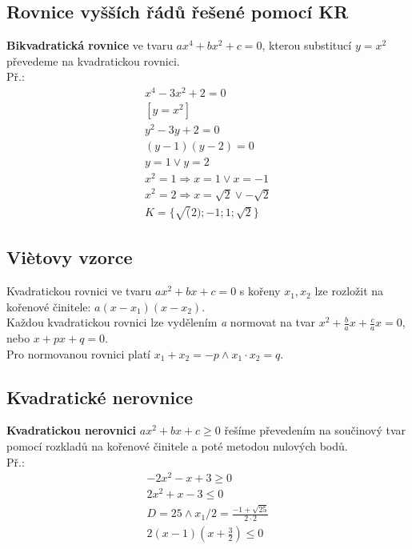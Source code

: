 \documentclass[12pt, a4paper]{article}
\newcommand{\imply}{\Rightarrow}
\begin{document}
\subsection*{Rovnice vyšších řádů řešené pomocí KR}
\textbf{Bikvadratická rovnice} ve tvaru $ax^4+bx^2+c=0$, kterou substitucí $y=x^2$ převedeme na kvadratickou rovnici.\\
Př.:\\
\[\begin{aligned}
x^4 - 3x^2+2=0\\
[y=x^2]\\
y^2 - 3y + 2 = 0\\
(y-1)(y-2) = 0\\
y = 1 \lor y = 2\\
x^2 = 1 \imply x = 1 \lor x = -1\\
x^2 = 2 \imply x = \sqrt{2} \lor -\sqrt{2}\\
K = \{ \sqrt(2);-1;1;\sqrt{2} \}
\end{aligned}\]

\subsection*{Viètovy vzorce}
Kvadratickou rovnici ve tvaru $ax^2+bx+c=0$ s kořeny $x_1,x_2$ lze rozložit na kořenové činitele: $a(x-x_1)(x-x_2)$.\\
Každou kvadratickou rovnici lze vydělením \textit{a} normovat na tvar $x^2+\frac{b}{a}x+\frac{c}{a}x=0$, nebo $x+px+q=0$.\\
Pro normovanou rovnici platí $x_1+x_2 = -p \land x_1 \cdot x_2 = q$.\\

\subsection*{Kvadratické nerovnice}
\textbf{Kvadratickou nerovnici} $ax^2+bx+c \geq 0$ řešíme převedením na součinový tvar pomocí rozkladů na kořenové činitele a poté metodou nulových bodů.\\
\pagebreak
Př.:\\
\[ \begin{aligned}
-2x^2-x+3 \geq 0\\
2x^2 + x - 3 \leq 0\\
D = 25 \land x_1/2=\frac{-1+\sqrt{25}}{2 \cdot 2}\\
2(x-1)(x+\frac{3}{2}) \leq 0\\
\end{aligned}\] 
\end{document}
